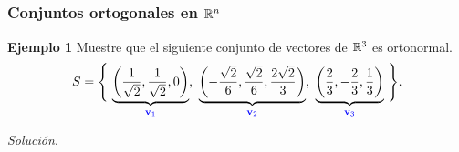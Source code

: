 
\subsection{}

\begin{frame}\frametitle{Conjuntos ortogonales en $\mathbb{R}^n$}


\begin{ej}{\textbf{Ejemplo 1}}
	Muestre que el siguiente conjunto de vectores de $\mathbb{R}^3$ es ortonormal.
	\[
		S = \Bigg\{ \, \underbrace{\left( \frac{1}{\sqrt{2}}, \frac{1}{\sqrt{2}}, 0 \right)}_{\color{blue}\mathbf{v}_1}, \ 
		\underbrace{\left( -\frac{\sqrt{2}}{6}, \frac{\sqrt{2}}{6}, \frac{2\sqrt{2}}{3} \right)}_{\color{blue}\mathbf{v}_2}, \ 
		\underbrace{\left( \frac{2}{3}, -\frac{2}{3}, \frac{1}{3} \right)}_{\color{blue}\mathbf{v}_3} \, \Bigg\}.
	\]
\end{ej}
\textit{Solución}.

\end{frame}


\subsection{}

